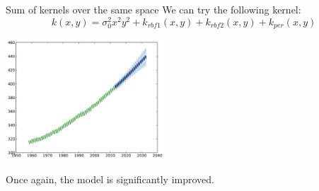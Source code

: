 \begin{frame}{Sum of kernels over the same space }
We can try the following kernel:
\begin{equation*}
k(x,y) = \sigma_0^2  x^2 y^2 + k_{rbf1}(x,y) + k_{rbf2}(x,y) + k_{per}(x,y)
\end{equation*}
\pause
\begin{center}
\vspace{-8mm}  \includegraphics[height=4.5cm]{3_gaussian_process_regression/figures/python/CO2-rbfabpq}
\end{center}
\begin{block}{}
\centering
\alert{Once again, the model is significantly improved.}
\end{block}
\end{frame}


